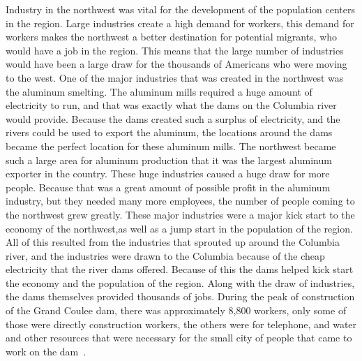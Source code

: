 \documentclass[12pt,twoside]{article}
\begin{document}
Industry in the northwest was vital for the development of the population
centers in the region. Large industries create a high demand for workers, this
demand for workers makes the northwest a better destination for potential
migrants, who would have a job in the region. This means that the large number
of industries would have been a large draw for the thousands of Americans who
were moving to the west. One of the major industries that was created in the
northwest was the aluminum smelting. The aluminum mills required a huge amount
of electricity to run, and that was exactly what the dams on the Columbia river
would provide. Because the dams created such a surplus of electricity, and the
rivers could be used to export the aluminum, the locations around the dams
became the perfect location for these aluminum mills. The northwest became such
a large area for aluminum production that it was the largest aluminum exporter
in the country. These huge industries caused a huge draw for more people.
Because that was a great amount of possible profit in the aluminum industry,
but they needed many more employees, the number of people coming to the
northwest grew greatly. These major industries were a major kick start to the
economy of the northwest,as well as a jump start in the population of the
region. All of this resulted from the industries that sprouted up around the
Columbia river, and the industries were drawn to the Columbia because of the
cheap electricity that the river dams offered. Because of this the dams helped
kick start the economy and the population of the region. Along with the draw of
industries, the dams themselves provided thousands of jobs. During the peak of
construction of the Grand Coulee dam, there was approximately 8,800 workers,
only some of those were directly construction workers, the others were for
telephone, and water and other resources that were necessary for the small city
of people that came to work on the dam~\cite{MOTA}.
\end{document}
